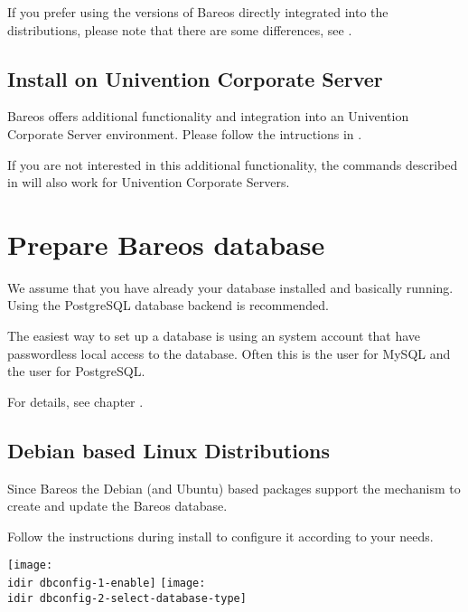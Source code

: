 If you prefer using the versions of Bareos directly integrated into the distributions, 
please note that there are some differences, see .

\subsection{Install on Univention Corporate Server}

Bareos offers additional functionality and integration into an Univention Corporate Server environment. 
Please follow the intructions in .

If you are not interested in this additional functionality,
the commands described in  will also work for Univention Corporate Servers.


\section{Prepare Bareos database}
    \label{sec:CreateDatabase}

We assume that you have already your database installed and basically running.
Using the PostgreSQL database backend is recommended.

The easiest way to set up a database is using an system account that have passwordless local access to the database.
Often this is the user  for MySQL and the user  for PostgreSQL.

For details, see chapter .

\subsection{Debian based Linux Distributions}

Since Bareos  the Debian (and Ubuntu) based packages support the  mechanism to create and update the Bareos database.

Follow the instructions during install to configure it according to your needs.

\begin{center}
\texttt{[image: \\idir dbconfig-1-enable]}
\texttt{[image: \\idir dbconfig-2-select-database-type]}
\end{center}

